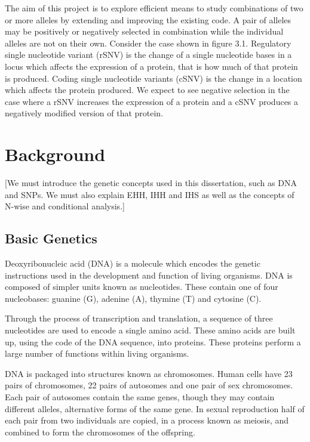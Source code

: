 \documentclass[a4paper,12pt]{report}
\begin{document}
The aim of this project is to explore efficient means to study combinations of two or more alleles by extending and improving the existing code. A pair of alleles may be positively or negatively selected in combination while the individual alleles are not on their own. Consider the case shown in figure 3.1. Regulatory single nucleotide variant (rSNV) is the change of a single nucleotide bases in a locus which affects the expression of a protein, that is how much of that protein is produced. Coding single nucleotide variants (cSNV) is the change in a location which affects the protein produced. We expect to see negative selection in the case where a rSNV increases the expression of a protein and a cSNV produces a negatively modified version of that protein. 


\chapter{Background}
[We must introduce the genetic concepts used in this dissertation, such as DNA and SNPs. We must also explain EHH, IHH and IHS as well as the concepts of N-wise and conditional analysis.]

\section{Basic Genetics}
Deoxyribonucleic acid (DNA) is a molecule which encodes the genetic instructions used in the development and function of living organisms. DNA is composed of simpler units known as nucleotides. These contain one of four nucleobases: guanine (G), adenine (A), thymine (T) and cytosine (C).

Through the process of transcription and translation, a sequence of three nucleotides are used to encode a single amino acid. These amino acids are built up, using the code of the DNA sequence, into proteins. These proteins perform a large number of functions within living organisms.

DNA is packaged into structures known as chromosomes. Human cells have 23 pairs of chromosomes, 22 pairs of autosomes and one pair of sex chromosomes. Each pair of autosomes contain the same genes, though they may contain different alleles, alternative forms of the same gene. In sexual reproduction half of each pair from two individuals are copied, in a process known as meiosis, and combined to form the chromosomes of the offspring.
\end{document}
